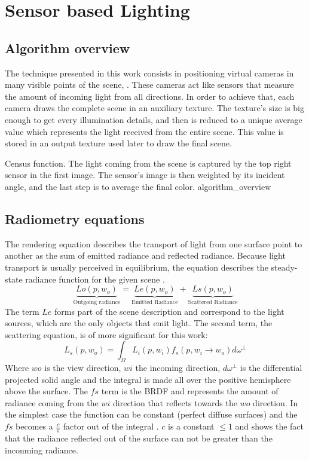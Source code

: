 \documentclass[10pt, conference]{IEEEtran}
\begin{document}
\section{Sensor based Lighting}
%

\subsection{Algorithm overview}
%
The technique presented in this work consists in positioning virtual cameras in many visible points of the scene, .
These cameras act like sensors that measure the amount of incoming light from all directions. 
In order to achieve that, each camera draws the complete scene in an auxiliary texture. 
The texture's size is big enough to get every illumination details, and then is reduced to a unique average value which represents the light received 
from the entire scene. 
This value is stored in an output texture used later to draw the final scene. 

\subimages
	{Census function. The light coming from the scene is captured by the top right sensor in the first image. 
	The sensor's image is then weighted by its incident angle, and the last step is to average the final color.}
	{algorithm_overview}{
}

\subsection{Radiometry equations}
%
The rendering equation \cite{The_rendering_equation} describes the transport of light from one surface point to another as the sum of emitted radiance and reflected radiance. Because light transport is usually perceived in equilibrium, the equation describes the steady-state radiance function for the given scene \cite{The_rendering_equation}.
\[
	\underbrace{Lo(p,w_o)}_\text{Outgoing radiance} = \underbrace{Le(p,w_o)}_\text{Emitted Radiance} + \underbrace{Ls(p,w_o)}_\text{Scattered Radiance}
\]
The term $Le$ forms part of the scene description and correspond to the light sources, which are the only objects that emit light. The second term, the scattering equation, is of more significant for this work: 
\[
	L_s(p,w_o) = \int_ \Omega L_i(p,w_i)f_s(p,w_i\rightarrow w_o)d\omega^\perp
\]
Where $wo$ is the view direction, $wi$ the incoming direction, $d\omega^\perp$ is the differential projected solid angle and the integral is made all over the positive hemisphere above the surface.  The $fs$ term is the BRDF \cite{brdf} and represents the amount of radiance coming from the $wi$ direction that reflects towards the $wo$ direction. 
In the simplest case the function can be constant (perfect diffuse surfaces) and the $fs$ becomes a $\frac{c}{\pi}$ factor out of the integral \cite{perfect_diffuse_surfaces}.
$c$ is a constant $\leq 1$ and shows the fact that the radiance reflected out of the surface can not be greater than the inconming radiance.\\
\end{document}
